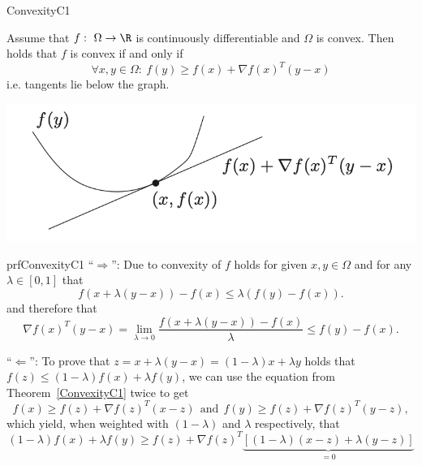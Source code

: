 \begin{theo}{ConvexityC1}
    \begin{minipage}{0.60\textwidth}
        Assume that $f: \ \Omega \rightarrow \R$ is continuously differentiable and $\Omega$ is convex. Then holds that $f$ is convex if and only if 
        \begin{equation*}
            \forall x,y \in \Omega: \ f(y) \geq f(x) + \nabla f(x)^T(y-x)
        \end{equation*}
        i\@.e\@. tangents lie below the graph.
    \end{minipage}
    \begin{minipage}{0.3\textwidth}
        \begin{center}
            \includegraphics[scale = 0.45]{Images/Fundamental/C1Convexity.png}
        \end{center}
    \end{minipage}
\end{theo}

\begin{prf}{prfConvexityC1}
    ``$\Rightarrow$'': Due to convexity of $f$ holds for given $x,y \in \Omega$  and for any $\lambda \in [0,1]$ that
    \begin{equation*}
        f(x + \lambda(y-x)) - f(x) \leq \lambda(f(y) - f(x)).
    \end{equation*}
    and therefore that 
    \begin{equation*}
        \nabla f(x)^T(y-x) 
            = \lim_{\lambda \rightarrow 0}  \frac{f(x + \lambda(y-x)) - f(x)}{\lambda}
            \leq f(y) - f(x).
    \end{equation*}

    ``$\Leftarrow$'': To prove that $z = x + \lambda(y-x) = (1-\lambda)x + \lambda y$ holds that $f(z) \leq (1-\lambda)f(x) + \lambda f(y)$, we can use the equation from Theorem~\ref{ConvexityC1} twice to get
    \begin{equation*}
        f(x) \geq f(z) + \nabla f(z)^T(x-z) \ \ \text{and} \ \ f(y) \geq f(z) + \nabla f(z)^T(y-z),
    \end{equation*}
    which yield, when weighted with $(1-\lambda)$ and $\lambda$ respectively, that
    \begin{equation*}
        (1-\lambda)f(x) + \lambda f(y) \geq f(z) + \nabla f(z)^T \underset{= 0}{\underbrace{\left[(1-\lambda)(x-z) + \lambda(y-z)\right]}}
    \end{equation*}
    \vspace{-0.75cm}
\end{prf}

